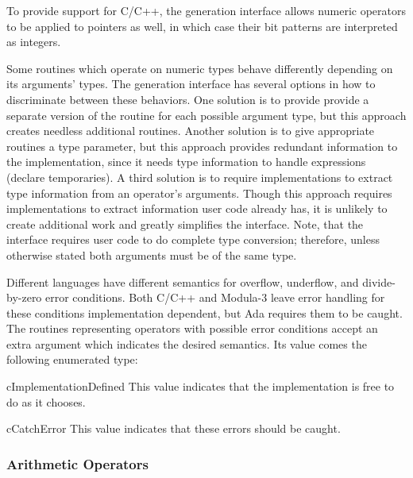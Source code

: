  To provide support for
C/C++, the generation interface allows numeric operators to be applied
to pointers as well, in which case their bit patterns are
interpreted as integers.

Some routines which operate on numeric types behave differently
depending on its arguments' types.  The generation interface has
several options in how to discriminate between these behaviors.  One
solution is to provide provide a separate version of the routine for
each possible argument type, but this approach creates needless
additional routines.  Another solution is to give appropriate routines
a type parameter, but this approach provides redundant information to
the implementation, since it needs type information to handle
expressions (\eg declare temporaries).  A third solution is to require
implementations to extract type information from an operator's
arguments.  Though this approach requires implementations to extract
information user code already has, it is unlikely to create additional
work and greatly simplifies the interface.  Note, that the interface
requires user code to do complete type conversion; therefore, unless
otherwise stated both arguments must be of the same type.

Different languages have different semantics for overflow, underflow,
and divide-by-zero error conditions.  Both C/C++ and Modula-3 leave
error handling for these conditions implementation dependent, but Ada
requires them to be caught.  The routines representing operators with
possible error conditions accept an extra argument which indicates the
desired semantics.  Its value comes the following enumerated type:
\begin{Description}
\item[cImplementationDefined] This value indicates that the
implementation is free to do as it chooses.
\item[cCatchError] This value indicates that these errors should be caught.
\end{Description}

\subsubsection{Arithmetic Operators}


